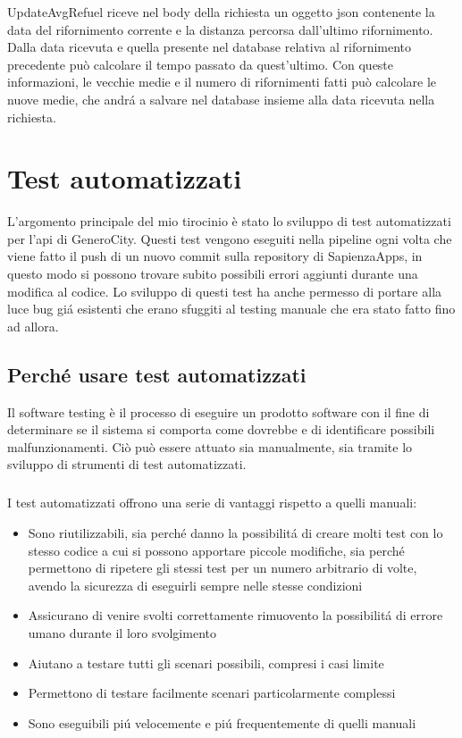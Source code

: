 \documentclass[italian, oneside]{sapthesis} %
\begin{document}
	UpdateAvgRefuel riceve nel body della richiesta un oggetto json contenente la data del rifornimento corrente e la distanza percorsa dall'ultimo rifornimento. Dalla data ricevuta e quella presente nel database relativa al rifornimento precedente pu\`o calcolare il tempo passato da quest'ultimo. Con queste informazioni, le vecchie medie e il numero di rifornimenti fatti pu\`o calcolare le nuove medie, che andr\'a a salvare nel database insieme alla data ricevuta nella richiesta.


\chapter{Test automatizzati}
	L'argomento principale del mio tirocinio \`e stato lo sviluppo di test automatizzati per l'api di GeneroCity. Questi test vengono eseguiti nella pipeline ogni volta che viene fatto il push di un nuovo commit sulla repository di SapienzaApps, in questo modo si possono trovare subito possibili errori aggiunti durante una modifica al codice. Lo sviluppo di questi test ha anche permesso di portare alla luce bug gi\'a esistenti che erano sfuggiti al testing manuale che era stato fatto fino ad allora.

	\section{Perch\'e usare test automatizzati}
		Il software testing \`e il processo di eseguire un prodotto software con il fine di determinare se il sistema si comporta come dovrebbe e di identificare possibili malfunzionamenti.
		Ci\`o pu\`o essere attuato sia manualmente, sia tramite lo sviluppo di strumenti di test automatizzati.

		\paragraph*{}
		I test automatizzati offrono una serie di vantaggi rispetto a quelli manuali:
		\begin{itemize}
			\item Sono riutilizzabili, sia perch\'e danno la possibilit\'a di creare molti test con lo stesso codice a cui si possono apportare piccole modifiche, sia perch\'e permettono di ripetere gli stessi test per un numero arbitrario di volte, avendo la sicurezza di eseguirli sempre nelle stesse condizioni
			\item Assicurano di venire svolti correttamente rimuovento la possibilit\'a di errore umano durante il loro svolgimento
			\item Aiutano a testare tutti gli scenari possibili, compresi i casi limite
			\item Permettono di testare facilmente scenari particolarmente complessi
			\item Sono eseguibili pi\'u velocemente e pi\'u frequentemente di quelli manuali
		\end{itemize}
\end{document}
